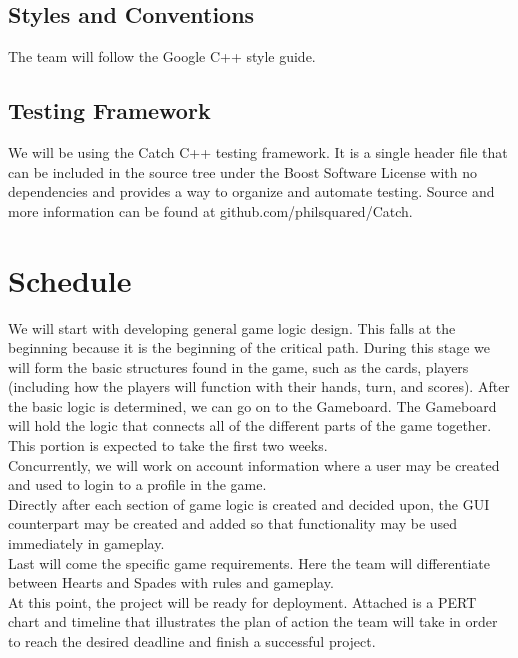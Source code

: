 \documentclass[11pt, titlepage]{article}
\begin{document}
    \subsection{Styles and Conventions}
    	The team will follow the Google C++ style guide.

    \subsection{Testing Framework}
    	We will be using the Catch C++ testing framework.  It is a single header file that can be included in the source tree under the Boost Software License with no dependencies and provides a way to organize and automate testing.  Source and more information can be found at github.com/philsquared/Catch.

    \section{Schedule}

	\tab We will start with developing general game logic design.  This falls at the beginning because it is the beginning of the critical path.  During this stage we will form the basic structures found in the game, such as the cards, players (including how the players will function with their hands, turn, and scores).
	After the basic logic is determined, we can go on to the Gameboard.  The Gameboard will hold the logic that connects all of the different parts of the game together.  This portion is expected to take the first two weeks.\\

Concurrently, we will work on account information where a user may be created and used to login to a profile in the game. \\

Directly after each section of game logic is created and decided upon, the GUI counterpart may be created and added so that functionality may be used immediately in gameplay.\\

Last will come the specific game requirements.  Here the team will differentiate between Hearts and Spades with rules and gameplay.\\

At this point, the project will be ready for deployment.  Attached is a PERT chart and timeline that illustrates the plan of action the team will take in order to reach the desired deadline and finish a successful project.
\end{document}
